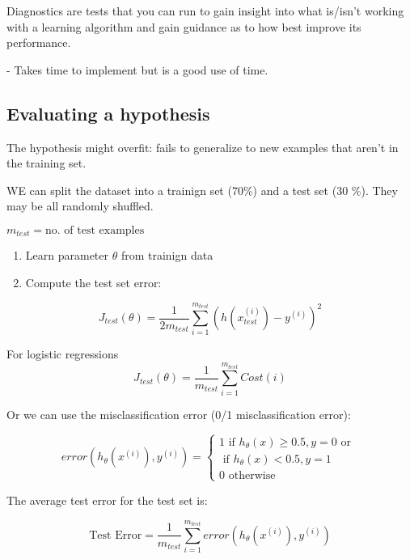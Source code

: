 \documentclass{article}
\begin{document}
Diagnostics are tests that you can run to gain insight into what is/isn't working with a learning algorithm and gain guidance as to how best improve its performance.

- Takes time to implement but is a good use of time.



\subsection{Evaluating a hypothesis}

The hypothesis might overfit: fails to generalize to new examples that aren't in the training set.

WE can split the dataset into a trainign set (70\%) and a test set (30 \%). They may be all randomly shuffled.

$m_{test} = \text{no. of test examples}$


\begin{mybox}


\begin{enumerate}
    \item Learn parameter $\theta$ from trainign data
    \item Compute the test set error:
\end{enumerate}



\begin{equation}
    J_{test} (\theta) = \frac{1}{2m_{test}} \sum_{i=1}^{m_{test}} \left(h(x_{test}^{(i)}) - y^{(i)} \right)^2
\end{equation}
    
For logistic regressions
\begin{equation}
     J_{test} (\theta) = \frac{1}{m_{test}} \sum_{i=1}^{m_{test}} Cost(i)
\end{equation}



Or we can use the misclassification error (0/1 misclassification error):
    
\begin{equation}
error\left(h_{\theta} (x^{(i)}), y^{(i)} \right)
     = \left\{
    \begin{array}{ll}
    \text{1 if } h_{\theta} (x) \geq 0.5, y = 0 \text{ or } \\ \text{ if } h_{\theta} (x) < 0.5, y=1 \\
    0 \text{ otherwise} 
    \end{array} \right.
\end{equation}
 
 
The average test error for the test set is:
 
\begin{equation}
    \text{Test Error} = \frac{1}{m_{test}} \sum_{i=1}^{m_{test}} error\left(h_{\theta} (x^{(i)}), y^{(i)} \right)
\end{equation}


\end{mybox} 
\end{document}
